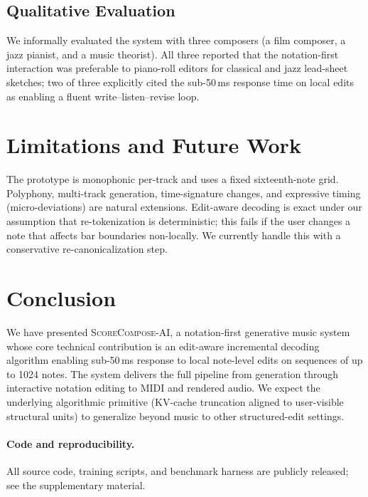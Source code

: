 \documentclass[11pt,a4paper]{article}
\begin{document}
\subsection{Qualitative Evaluation}

We informally evaluated the system with three composers (a film composer,
a jazz pianist, and a music theorist). All three reported that the
notation-first interaction was preferable to piano-roll editors for
classical and jazz lead-sheet sketches; two of three explicitly cited the
sub-50\,ms response time on local edits as enabling a fluent
write--listen--revise loop.

\section{Limitations and Future Work}

The prototype is monophonic per-track and uses a fixed sixteenth-note
grid. Polyphony, multi-track generation, time-signature changes, and
expressive timing (micro-deviations) are natural extensions. Edit-aware
decoding is exact under our assumption that re-tokenization is
deterministic; this fails if the user changes a note that affects bar
boundaries non-locally. We currently handle this with a conservative
re-canonicalization step.

\section{Conclusion}

We have presented \textsc{ScoreCompose-AI}, a notation-first generative
music system whose core technical contribution is an edit-aware
incremental decoding algorithm enabling sub-50\,ms response to local
note-level edits on sequences of up to 1024 notes. The system delivers
the full pipeline from generation through interactive notation editing
to MIDI and rendered audio. We expect the underlying algorithmic
primitive (KV-cache truncation aligned to user-visible structural units)
to generalize beyond music to other structured-edit settings.

\paragraph{Code and reproducibility.}
All source code, training scripts, and benchmark harness are publicly
released; see the supplementary material.



\end{document}

